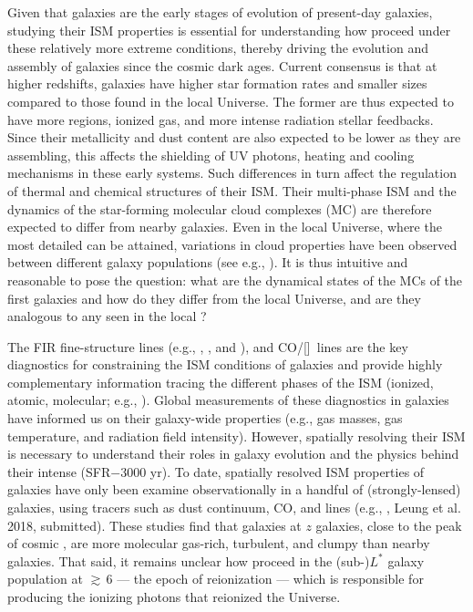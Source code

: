 \IfFileExists{emulateapjlegacy.cls}{\documentclass[iop]{emulateapjlegacy}}{\documentclass[iop]{emulateapj}}
\begin{document}
Given that \highz galaxies are the early stages of evolution of present-day galaxies, studying their ISM properties is essential for understanding how \SF proceed under these relatively more extreme conditions, thereby driving the evolution and assembly 
of galaxies 
since the cosmic dark ages.
Current consensus is that at higher redshifts, galaxies have higher 
star formation rates \citep[SFR; ][]{Behroozi13b, Sparre15a, Maiolino15a, Dunlop17a} and 
smaller sizes \citep[e.g.,][]{Bouwens11a, Ono13a} compared to those found in the local Universe.
The former are thus expected to have more  regions, ionized gas, and more intense radiation stellar feedbacks. 
Since their metallicity and dust content are also expected to be lower as they are assembling, 
this affects the shielding of UV photons, heating and cooling mechanisms in these early systems. Such differences in turn 
affect the regulation of thermal and chemical structures of their ISM. 
Their multi-phase ISM and the dynamics of the star-forming molecular cloud complexes (MC)
are therefore expected to differ from nearby galaxies.
Even in the local Universe, where the most detailed \obs can be attained, variations in cloud properties have been 
observed between different galaxy populations (see e.g., \citealt{Hughes10a, Hughes13b}).
It is thus intuitive and reasonable to pose the question: what are the dynamical states of the MCs of the first galaxies and 
how do they differ from the local Universe, and are they analogous to any seen in the local \galpop?
% 

The FIR fine-structure lines (e.g., \cii, \nii, and \oiii), and CO/[\ci]~lines are the key diagnostics for
constraining the ISM conditions of galaxies and
provide highly complementary information tracing the different phases of the ISM (ionized,
atomic, molecular; e.g., \citealt{Scoville74a, Rubin85a, Malhotra01a}).
Global measurements of these diagnostics in \highz galaxies
have informed us on their galaxy-wide properties (e.g.,
gas masses, gas temperature, and radiation field intensity).
However, spatially resolving their ISM is necessary to understand their roles in galaxy evolution and
the physics behind their intense \SF (SFR$-$3000\,\Msun\,yr\pmOne).
To date, spatially resolved ISM properties of \highz galaxies
have only been examine observationally in a handful of (strongly-lensed)
galaxies, using tracers such as
dust continuum, CO, and \cii lines (e.g., \citealt{Swinbank11a, Hodge15a, Ferkinhoff15a, Hodge16a},
Leung et al. 2018, submitted).
These studies find that galaxies at $z$ galaxies, close to the peak of cosmic \SF, are more
molecular gas-rich, turbulent, and clumpy than nearby galaxies.
That said, it remains unclear how \SF proceed in the (sub-)$L^*$ galaxy population at \z$\gtrsim$\,6 --- 
the epoch of reionization  ---
which is responsible for producing the
ionizing photons that reionized the Universe.
\end{document}
